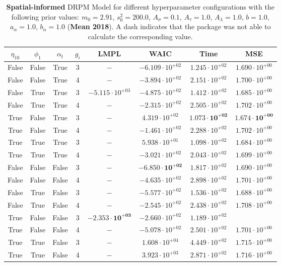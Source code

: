 \documentclass[12pt,a4paper]{article}
\begin{document}
\begin{table}
\caption{\textbf{Spatial-informed} DRPM Model for different hyperparameter configurations with the following prior values: $m_0 = 2.91$, $s_0^2 
= 200.0$, $A_\sigma = 0.1$, $A_\tau = 1.0$, $A_\lambda = 1.0$, $b = 1.0$, $a_\alpha = 1.0$, $b_\alpha = 1.0$ (\textbf{Mean 2018}).
A dash indicates that the package was not able to calculate the corresponding value.
}
\centering\begin{tabular}{cccccccc}
\toprule
$\eta_{10}$ & $\phi_1$ & $\alpha_t$ & $g_i$ & LMPL & WAIC & Time & MSE \\
\midrule
False & False & True & 3 & $-$ & $-6.109 \cdot 10^{+02}$ & $1.245 \cdot 10^{+02}$ & $1.690 \cdot 10^{+00}$ \\
False & False & True & 4 & $-$ & $-3.894 \cdot 10^{+02}$ & $2.151 \cdot 10^{+02}$ & $1.700 \cdot 10^{+00}$ \\
False & True & True & 3 & $-5.115 \cdot 10^{+03}$ & $-4.875 \cdot 10^{+02}$ & $1.412 \cdot 10^{+02}$ & $1.685 \cdot 10^{+00}$ \\
False & True & True & 4 & $-$ & $-2.315 \cdot 10^{+02}$ & $2.505 \cdot 10^{+02}$ & $1.702 \cdot 10^{+00}$ \\
True & False & True & 3 & $-$ & $4.319 \cdot 10^{+02}$ & $\mathbf{1.073 \cdot 10^{+02}}$ & $\mathbf{1.674 \cdot 10^{+00}}$ \\
True & False & True & 4 & $-$ & $-1.461 \cdot 10^{+02}$ & $2.288 \cdot 10^{+02}$ & $1.702 \cdot 10^{+00}$ \\
True & True & True & 3 & $-$ & $5.938 \cdot 10^{+01}$ & $1.098 \cdot 10^{+02}$ & $1.684 \cdot 10^{+00}$ \\
True & True & True & 4 & $-$ & $-3.021 \cdot 10^{+02}$ & $2.043 \cdot 10^{+02}$ & $1.699 \cdot 10^{+00}$ \\
False & False & False & 3 & $-$ & $\mathbf{-6.850 \cdot 10^{+02}}$ & $1.817 \cdot 10^{+02}$ & $1.690 \cdot 10^{+00}$ \\
False & False & False & 4 & $-$ & $-4.635 \cdot 10^{+02}$ & $2.898 \cdot 10^{+02}$ & $1.701 \cdot 10^{+00}$ \\
False & True & False & 3 & $-$ & $-5.577 \cdot 10^{+02}$ & $1.536 \cdot 10^{+02}$ & $1.688 \cdot 10^{+00}$ \\
False & True & False & 4 & $-$ & $-2.545 \cdot 10^{+02}$ & $2.438 \cdot 10^{+02}$ & $1.708 \cdot 10^{+00}$ \\
True & False & False & 3 & $\mathbf{-2.353 \cdot 10^{+03}}$ & $-2.660 \cdot 10^{+02}$ & $1.189 \cdot 10^{+02}$ \\
True & False & False & 4 & $-$ & $-5.078 \cdot 10^{+02}$ & $2.501 \cdot 10^{+02}$ & $1.701 \cdot 10^{+00}$ \\
True & True & False & 3 & $-$ & $1.608 \cdot 10^{+04}$ & $4.449 \cdot 10^{+02}$ & $1.715 \cdot 10^{+00}$ \\
True & True & False & 4 & $-$ & $3.923 \cdot 10^{+03}$ & $2.871 \cdot 10^{+02}$ & $1.716 \cdot 10^{+00}$ \\
\bottomrule
\end{tabular}
\label{tab:DRPMExtensionMean2018}
\end{table}
\end{document}
